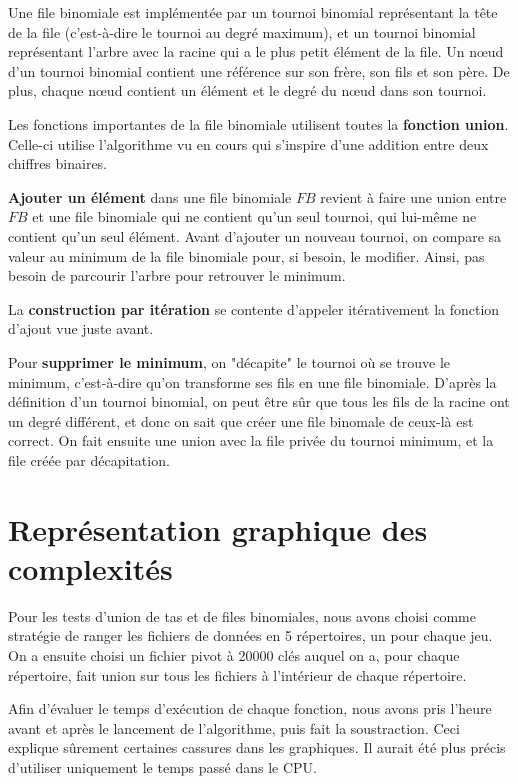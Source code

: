 \documentclass{article}
\begin{document}
Une file binomiale est implémentée par un tournoi binomial représentant la tête de la file (c'est-à-dire le tournoi au degré maximum), et un tournoi binomial représentant l’arbre avec la racine qui a le plus petit élément de la file. 
Un nœud d’un tournoi binomial contient une référence sur son frère, son fils et son père. De plus, chaque nœud contient un élément et le degré du nœud dans son tournoi.

Les fonctions importantes de la file binomiale utilisent toutes la \textbf{fonction union}. Celle-ci utilise l’algorithme vu en cours qui s’inspire d’une addition entre deux chiffres binaires.

\textbf{Ajouter un élément} dans une file binomiale $FB$ revient à faire une union entre $FB$ et une file binomiale qui ne contient qu'un seul tournoi, qui lui-même ne contient qu'un seul élément. Avant d’ajouter un nouveau tournoi, on compare sa valeur au minimum de la file binomiale pour, si besoin, le modifier. Ainsi, pas besoin de parcourir l’arbre pour retrouver le minimum.

La \textbf{construction par itération} se contente d'appeler itérativement la fonction d'ajout vue juste avant.

Pour \textbf{supprimer le minimum}, on "décapite" le tournoi où se trouve le minimum, c'est-à-dire qu'on transforme ses fils en une file binomiale. D'après la définition d'un tournoi binomial, on peut être sûr que tous les fils de la racine ont un degré différent, et donc on sait que créer une file binomale de ceux-là est correct. On fait ensuite une union avec la file privée du tournoi minimum, et la file créée par décapitation.

\section{Représentation graphique des complexités}

Pour les tests d’union de tas et de files binomiales, nous avons choisi comme stratégie de ranger les fichiers de données en 5 répertoires, un pour chaque jeu. On a ensuite choisi un fichier pivot à 20000 clés auquel on a, pour chaque répertoire, fait union sur tous les fichiers à l’intérieur de chaque répertoire.

Afin d’évaluer le temps d’exécution de chaque fonction, nous avons pris l’heure avant et après le lancement de l’algorithme, puis fait la soustraction. Ceci explique sûrement certaines cassures dans les graphiques. Il aurait été plus précis d’utiliser uniquement le temps passé dans le CPU.
\end{document}

